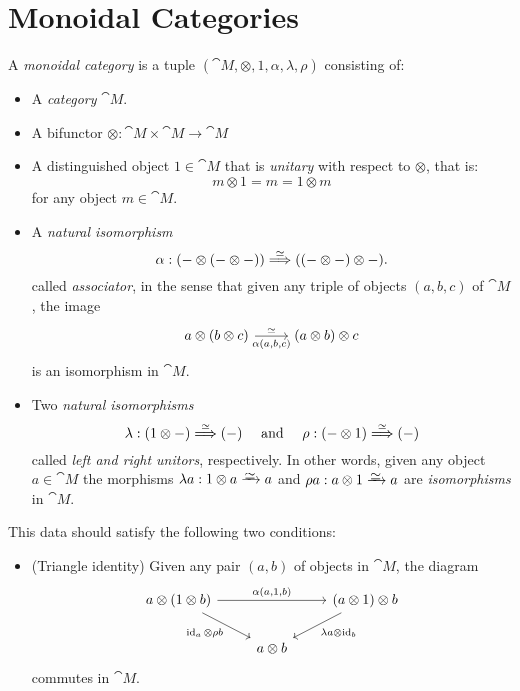 \documentclass[../../deep-dive]{subfiles}
\begin{document}
\section{Monoidal Categories}

\begin{definition}
\label{def:monoidal-category}
A \emph{monoidal category} is a tuple
\((\cat M, \otimes, 1, \alpha, \lambda, \rho)\) consisting of:
\begin{itemize}\setlength\itemsep{0em}
\item A \emph{category} \(\cat M\).

\item A bifunctor \(\otimes: \cat M \times \cat M \to \cat M\)

\item A distinguished object \(1 \in \cat M\) that is \emph{unitary} with
  respect to \(\otimes\), that is:
  \[
  m \otimes 1 = m = 1 \otimes m
  \]
  for any object \(m \in \cat M\).

\item A \emph{natural isomorphism}
  \[
  \alpha: (- \otimes (- \otimes -))
  \overset{\simeq}\Longrightarrow ((- \otimes -) \otimes -).
  \]
  called \emph{associator}, in the sense that given any triple of objects \((a,
  b, c)\) of \(\cat M\), the image
  \[
  \begin{tikzcd}
  a \otimes (b \otimes c)
  \ar[r, "{\alpha(a, b, c)}"', "\dis"]
  &(a \otimes b) \otimes c
  \end{tikzcd}
  \]
  is an isomorphism in \(\cat M\).

\item Two \emph{natural isomorphisms}
  \[
  \lambda: (1 \otimes -)
  \overset{\simeq}\Longrightarrow (-)
  \quad
  \text{ and }
  \quad
  \rho: (- \otimes 1)
  \overset{\simeq}\Longrightarrow (-)
  \]
  called \emph{left and right unitors}, respectively. In other words, given any
  object \(a \in \cat M\) the morphisms \(\lambda a: 1 \otimes a \isoto a\) and
  \(\rho a: a \otimes 1 \isoto a\) are \emph{isomorphisms} in \(\cat M\).
\end{itemize}
This data should satisfy the following two conditions:
\begin{itemize}\setlength\itemsep{0em}
\item (Triangle identity) Given any pair \((a, b)\) of objects in \(\cat M\),
  the diagram
  \[
  \begin{tikzcd}
  a \otimes (1 \otimes b) \ar[rr, "{\alpha(a, 1, b)}"]
  \ar[rd, "\Id_a \otimes \rho b"']
  & &(a \otimes 1) \otimes b \ar[ld, "\lambda a \otimes \Id_b"]
  \\
  &a \otimes b &
  \end{tikzcd}
  \]
  commutes in \(\cat M\).


\end{itemize}
\end{definition}
\end{document}

